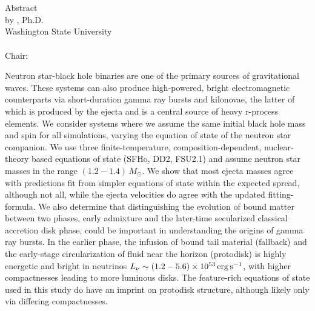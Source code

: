 \label{chap:chapter-1}

\begin{center}
	\begin{singlespace}
		\label{ssec:abstract}

		\MakeUppercase{\mytitleA}\\
    	\bigskip
    	\MakeUppercase{\mytitleB}\\
		\bigskip
		Abstract\\
		\bigskip \bigskip \bigskip
		by \myname, Ph.D.\\
		Washington State University\\
		\, \currentyear \\
		\bigskip \bigskip \bigskip
		Chair: \mychair	
	\end{singlespace}
\end{center}
  

Neutron star-black hole binaries are one of the primary sources of 
gravitational waves.  
These systems can also produce high-powered,
bright electromagnetic counterparts via short-duration gamma
ray bursts and kilonovae, the latter of which is produced by the ejecta and is a central source of heavy r-process elements.
We consider systems where we assume the same initial black hole mass
and spin for all simulations, varying the equation of state of the neutron
star companion.
We use three finite-temperature, composition-dependent, nuclear-theory based
equations of state (SFHo, DD2, FSU2.1) and assume neutron star masses
in the range $(1.2 - 1.4)\,M_\odot$.
We show that most ejecta masses agree with predictions fit from simpler 
equations of state within the expected spread, although not all, while the ejecta velocities do agree with the 
updated fitting-formula.
We also determine that distinguishing the evolution of bound matter between two phases, early admixture and the later-time secularized classical accretion disk phase,
could be important in understanding the origins of 
gamma ray bursts.
In the earlier phase, the infusion of bound tail material (fallback) and the early-stage circularization of fluid near the horizon (protodisk) is highly energetic and bright in neutrinos \mbox{$L_{\nu} \sim (1.2 - 5.6)\times10^{53}\,{\rm erg\,s}^{-1}$}, with higher compactnesses leading to more luminous disks.
The feature-rich equations of state used in this study do have an imprint on protodisk structure, although likely only via differing compactnesses.


\newpage